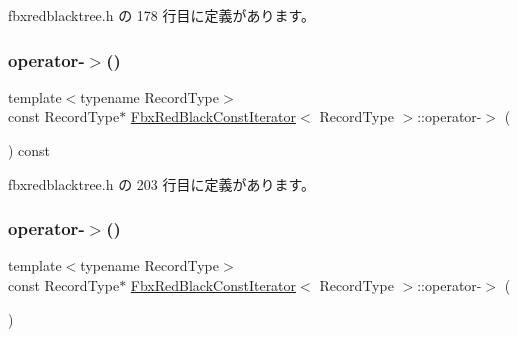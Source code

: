  fbxredblacktree.\+h の 178 行目に定義があります。

\mbox{\label{class_fbx_red_black_const_iterator_add2e613de14418803884f3b8318d35a1}} 
\subsubsection{\texorpdfstring{operator-\/$>$()}{operator->()}\hspace{0.1cm}{\footnotesize\ttfamily [1/2]}}
{\footnotesize\ttfamily template$<$typename Record\+Type$>$ \\
const Record\+Type$\ast$ \hyperlink{class_fbx_red_black_const_iterator}{Fbx\+Red\+Black\+Const\+Iterator}$<$ Record\+Type $>$\+::operator-\/$>$ (\begin{DoxyParamCaption}{ }\end{DoxyParamCaption}) const\hspace{0.3cm}{\ttfamily [inline]}}



 fbxredblacktree.\+h の 203 行目に定義があります。

\mbox{\label{class_fbx_red_black_const_iterator_a2e6a8544f7e725eb401ee6cde016c677}} 
\subsubsection{\texorpdfstring{operator-\/$>$()}{operator->()}\hspace{0.1cm}{\footnotesize\ttfamily [2/2]}}
{\footnotesize\ttfamily template$<$typename Record\+Type$>$ \\
const Record\+Type$\ast$ \hyperlink{class_fbx_red_black_const_iterator}{Fbx\+Red\+Black\+Const\+Iterator}$<$ Record\+Type $>$\+::operator-\/$>$ (\begin{DoxyParamCaption}{ }\end{DoxyParamCaption})\hspace{0.3cm}{\ttfamily [inline]}}



